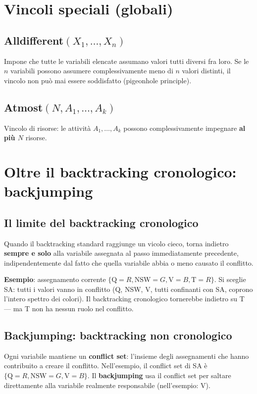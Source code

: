 \documentclass[11pt,a4paper]{report}
\begin{document}
\section{Vincoli speciali (globali)}

\subsection*{Alldifferent$(X_1,\dots,X_n)$}

Impone che tutte le variabili elencate assumano valori tutti diversi fra loro. Se le $n$ variabili possono assumere complessivamente meno di $n$ valori distinti, il vincolo non può mai essere soddisfatto (pigeonhole principle).

\subsection*{Atmost$(N, A_1,\dots,A_k)$}

Vincolo di risorse: le attività $A_1,\dots,A_k$ possono complessivamente impegnare \textbf{al più $N$} risorse.

\section{Oltre il backtracking cronologico: backjumping}

\subsection*{Il limite del backtracking cronologico}

Quando il backtracking standard raggiunge un vicolo cieco, torna indietro \textbf{sempre e solo} alla variabile assegnata al passo immediatamente precedente, indipendentemente dal fatto che quella variabile abbia o meno causato il conflitto.

\textbf{Esempio}: assegnamento corrente $\{\text{Q}{=}R,\text{NSW}{=}G,\text{V}{=}B,\text{T}{=}R\}$. Si sceglie SA: tutti i valori vanno in conflitto (Q, NSW, V, tutti confinanti con SA, coprono l'intero spettro dei colori). Il backtracking cronologico tornerebbe indietro su T --- ma T non ha nessun ruolo nel conflitto.

\subsection*{Backjumping: backtracking non cronologico}

Ogni variabile mantiene un \textbf{conflict set}: l'insieme degli assegnamenti che hanno contribuito a creare il conflitto. Nell'esempio, il conflict set di SA è $\{\text{Q}{=}R,\text{NSW}{=}G,\text{V}{=}B\}$. Il \textbf{backjumping} usa il conflict set per saltare direttamente alla variabile realmente responsabile (nell'esempio: V).
\end{document}
